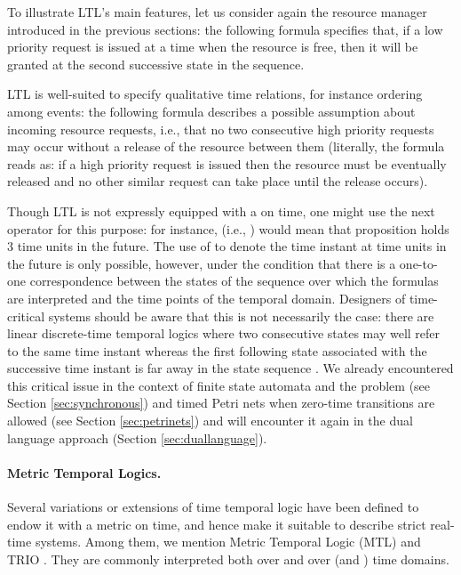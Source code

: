 To illustrate LTL's main features, let us consider again the 
resource manager introduced in the previous sections: the following 
formula specifies that, if a low priority request is issued at 
a time when the resource is free, then it will be granted at 
the second successive state in the sequence. 


LTL is well-suited to specify qualitative time relations, for 
instance ordering among events: the following formula describes 
a possible assumption about incoming resource requests, i.e., 
that no two consecutive high priority requests may occur without 
a release of the resource between them (literally, the formula 
reads as: if a high priority request is issued then the resource must be eventually released and no other 
similar request can take place until the release occurs). 


Though LTL is not expressly equipped with a  on time, one might
use the next operator  for this purpose: for instance,  (i.e., ) would mean that proposition 
holds 3 time units in the future. The use of  to denote the
time instant at  time units in the future is only possible,
however, under the condition that there is a one-to-one correspondence
between the states of the sequence over which the formulas are
interpreted and the time points of the temporal domain. Designers of
time-critical systems should be aware that this is not necessarily the
case: there are linear discrete-time temporal logics where two
consecutive states may well refer to the same time instant whereas the
first following state associated with the successive time instant is
far away in the state sequence \cite{Lam94,MP92,Ost89}. We already
encountered this critical issue in the context of finite state
automata and the  problem (see Section \ref{sec:synchronous})
and timed Petri nets when zero-time transitions are allowed (see
Section \ref{sec:petrinets}) and will encounter it again in the dual
language approach (Section \ref{sec:duallanguage}).


\paragraph{Metric Temporal Logics.}
Several variations or extensions of  time temporal logic have
been defined to endow it with a metric on time, and hence make it
suitable to describe strict real-time systems. Among them, we mention
Metric Temporal Logic (MTL) \cite{Koy90} and TRIO \cite{GMM90,MMG92}.
They are commonly interpreted both over  and over  (and
) time domains.

